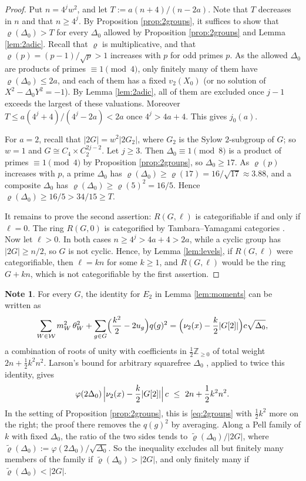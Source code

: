 \documentclass[10pt]{article}
\theoremstyle{plain}
\theoremstyle{definition}
\newtheorem{note}[theorem]{Note}
\theoremstyle{plain}
\begin{document}
\begin{proof}
Put $n=4^jw^2$, and let $T:=a(n+4)/(n-2a)$. Note that $T$ decreases in $n$ and that $n\geq4^j$. By Proposition \ref{prop:2groups}, it suffices to show that $\varrho(\Delta_0)>T$ for every $\Delta_0$ allowed by Proposition \ref{prop:2groups} and Lemma \ref{lem:2adic}. Recall that $\varrho$ is multiplicative, and that $\varrho(p)=(p-1)/\sqrt p>1$ increases with $p$ for odd primes $p$. As the allowed $\Delta_0$ are products of primes $\equiv1\pmod4$, only finitely many of them have $\varrho(\Delta_0)\leq2a$, and each of them has a fixed $v_2(X_0)$ (or no solution of $X^2-\Delta_0Y^2=-1$). By Lemma \ref{lem:2adic}, all of them are excluded once $j-1$ exceeds the largest of these valuations. Moreover $T\leq a(4^j+4)/(4^j-2a)<2a$ once $4^j>4a+4$. This gives $j_0(a)$.

For $a=2$, recall that $|2G|=w^2|2G_2|$, where $G_2$ is the Sylow $2$-subgroup of $G$; so $w=1$ and $G\cong C_4\times C_2^{2j-2}$. Let $j\geq3$. Then $\Delta_0\equiv1\pmod8$ is a product of primes $\equiv1\pmod4$ by Proposition \ref{prop:2groups}, so $\Delta_0\geq17$. As $\varrho(p)$ increases with $p$, a prime $\Delta_0$ has $\varrho(\Delta_0)\geq\varrho(17)=16/\sqrt{17}\approx3.88$, and a composite $\Delta_0$ has $\varrho(\Delta_0)\geq\varrho(5)^2=16/5$. Hence $\varrho(\Delta_0)\geq16/5>34/15\geq T$.

It remains to prove the second assertion: $R(G,\ell)$ is categorifiable if and only if $\ell=0$. The ring $R(G,0)$ is categorified by Tambara--Yamagami categories \cite{TY98}. Now let $\ell>0$. In both cases $n\geq4^j>4a+4>2a$, while a cyclic group has $|2G|\geq n/2$, so $G$ is not cyclic. Hence, by Lemma \ref{lem:levels}, if $R(G,\ell)$ were categorifiable, then $\ell=kn$ for some $k\geq1$, and $R(G,\ell)$ would be the ring $G+kn$, which is not categorifiable by the first assertion.
\end{proof}

\begin{note}\label{rem:2groups}
For every $G$, the identity for $E_2$ in Lemma \ref{lem:moments} can be written as
\[
\sum_{W\in\mathcal{W}}m_W^2\,\theta_W^2+\sum_{g\in G}\Bigl(\frac{k^2}2-2u_g\Bigr)q(g)^2=\Bigl(\nu_2(x)-\frac k2|G[2]|\Bigr)c\sqrt{\Delta_0},
\]
a combination of roots of unity with coefficients in $\frac12\mathbb{Z}_{\geq0}$ of total weight $2n+\frac12k^2n^2$. Larson's bound for arbitrary squarefree $\Delta_0$ \cite[Theorem 6.2]{MR3229513}, applied to twice this identity, gives
\[
\varphi(2\Delta_0)\,\Bigl|\nu_2(x)-\frac k2|G[2]|\Bigr|\,c\ \leq\ 2n+\frac12k^2n^2 .
\]
In the setting of Proposition \ref{prop:2groups}, this is \eqref{eq:2groups} with $\frac12k^2$ more on the right; the proof there removes the $q(g)^2$ by averaging. Along a Pell family of $k$ with fixed $\Delta_0$, the ratio of the two sides tends to $\tilde\varrho(\Delta_0)/|2G|$, where $\tilde\varrho(\Delta_0):=\varphi(2\Delta_0)/\sqrt{\Delta_0}$. So the inequality excludes all but finitely many members of the family if $\tilde\varrho(\Delta_0)>|2G|$, and only finitely many if $\tilde\varrho(\Delta_0)<|2G|$.
\end{note}
\end{document}

